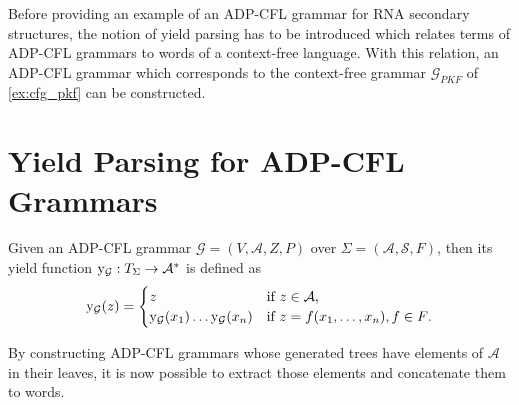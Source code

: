 \documentclass[
    a4paper,
    12pt,
    twoside,
    BCOR=12mm,
    parskip=half,
    chapterprefix,
    numbers=noenddot,
    bibliography=totoc
]{scrbook}
\begin{document}
Before providing an example of an ADP-CFL grammar for RNA secondary structures, the notion of yield parsing has to be introduced which relates terms of ADP-CFL grammars to words of a context-free language. With this relation, an ADP-CFL grammar which corresponds to the context-free grammar $\mathcal{G}_{PKF}$ of \cref{ex:cfg_pkf} can be constructed.
         
\section{Yield Parsing for ADP-CFL Grammars}
\label{sec:yield_parsing}

Given an ADP-CFL grammar $\mathcal{G}=(V,\mathcal{A},Z,P)$ over $\Sigma=(\mathcal{A},\mathcal{S},F)$, then its yield function $\mathrm{y}_\mathcal{G} : T_\Sigma \to \mathcal{A}^*$ is defined as
\begin{equation}
	\label{eq:y}
	\mathrm{y}_\mathcal{G}(z) = 
	\begin{cases}
		z & \text{if $z \in \mathcal{A}$,}\\
		\mathrm{y}_\mathcal{G}(x_1)\ldots\mathrm{y}_\mathcal{G}(x_n) & \text{if $z = f(x_1,\ldots,x_n), f \in F$.}
	\end{cases}
\end{equation}

By constructing ADP-CFL grammars whose generated trees have elements of $\mathcal{A}$ in their leaves, it is now possible to extract those elements and concatenate them to words.
\end{document}
